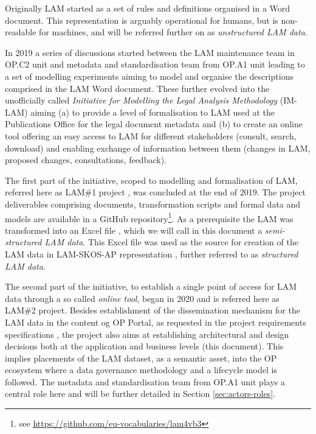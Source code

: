	Originally LAM started as a set of rules and definitions organised in a Word document. This representation is arguably operational for humans, but is non-readable for machines, and will be referred further on as \textit{unstructured LAM data}. 
	
	In 2019 a series of discussions started between the LAM maintenance team in OP.C2 unit and metadata and standardisation team from OP.A1 unit leading to a set of modelling experiments aiming to model and organise the descriptions comprised in the LAM Word document\citep{lam-eurlex-spec-2017}. These further evolved into the unofficially called \textit{Initiative for Modelling the Legal Analysis Methodology} (IM-LAM) \citep{lam-preliminary-requirements-2019} aiming (a) to provide a level of formalisation to LAM used at the Publications Office for the legal document metadata and (b) to create an online tool offering an easy access to LAM for different stakeholders (consult, search, download) and enabling exchange of information between them (changes in LAM, proposed changes, consultations, feedback).
	
	The first part of the initiative, scoped to modelling and formalisation of LAM, referred here as LAM\#1 project \citep{lam-preliminary-requirements-2019}, was concluded at the end of 2019. The project deliverables comprising documents, transformation scripts and formal data and models are available in a GitHub repository\footnote{see \url{https://github.com/eu-vocabularies/lam4vb3}}. As a prerequisite the LAM was transformed into an Excel file \citep{lam-excel-structure-2019}, which we will call in this document a \textit{semi-structured LAM data}. This Excel file was used as the source for creation of the LAM data in LAM-SKOS-AP representation \citep{lam-skos-ap-2019}, further referred to as \textit{structured LAM data}.
	

	The second part of the initiative, to establish a single point of access for LAM data through a so called \textit{online tool}, began in 2020 and is referred here as LAM\#2 project. Besides establishment of the dissemination mechanism for the LAM data in the content og OP Portal, as requested in the project requirements specifications \citep{lam-requirements-2020}, the project also aims at establishing architectural and design decisions both at the application and business levels (this document). This implies placements of the LAM dataset, as a semantic asset, into the OP ecosystem where a data governance methodology and a lifecycle model is followed. The metadata and standardisation team from OP.A1 unit plays a central role here and will be further detailed in Section \ref{sec:actors-roles}.
	
